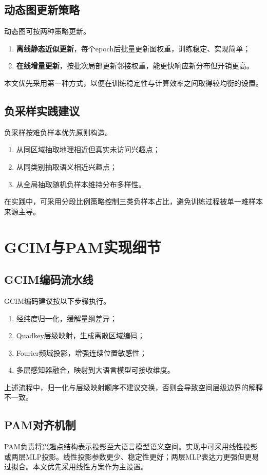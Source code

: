 \subsection{动态图更新策略}
动态图可按两种策略更新。
\begin{enumerate}
    \item \textbf{离线静态近似更新}，每个epoch后批量更新图权重，训练稳定、实现简单；
    \item \textbf{在线增量更新}，按批次局部更新邻接权重，能更快响应新分布但开销更高。
\end{enumerate}
\par\indent 本文优先采用第一种方式，以便在训练稳定性与计算效率之间取得较均衡的设置。

\subsection{负采样实践建议}
负采样按难负样本优先原则构造。
\begin{enumerate}
    \item 从同区域抽取地理相近但真实未访问兴趣点；
    \item 从同类别抽取语义相近兴趣点；
    \item 从全局抽取随机负样本维持分布多样性。
\end{enumerate}
\par\indent 在实践中，可采用分段比例策略控制三类负样本占比，避免训练过程被单一难样本来源主导。

\section{GCIM与PAM实现细节}
\subsection{GCIM编码流水线}
GCIM编码建议按以下步骤执行。
\begin{enumerate}
    \item 经纬度归一化，缓解量纲差异；
    \item Quadkey层级映射，生成离散区域编码；
    \item Fourier频域投影，增强连续位置敏感性；
    \item 多层感知器融合，映射到大语言模型可接收维度。
\end{enumerate}
\par\indent 上述流程中，归一化与层级映射顺序不建议交换，否则会导致空间层级边界的解释不一致。

\subsection{PAM对齐机制}
PAM负责将兴趣点结构表示投影至大语言模型语义空间。实现中可采用线性投影或两层MLP投影。线性投影参数更少、稳定性更好；两层MLP表达力更强但更易过拟合。本文优先采用线性方案作为主设置。

